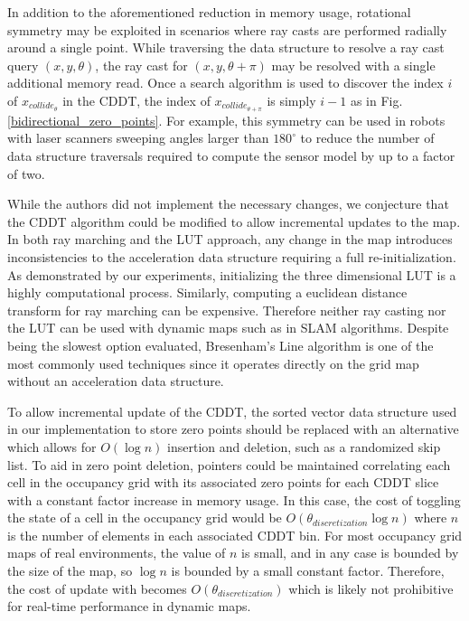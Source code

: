 \documentclass[letterpaper, 10 pt, conference]{ieeeconf}  %
\begin{document}
In addition to the aforementioned reduction in memory usage, rotational symmetry may be exploited in scenarios where ray casts are performed radially around a single point. While traversing the data structure to resolve a ray cast query $(x,y,\theta)$, the ray cast for $(x,y,\theta+\pi)$ may be resolved with a single additional memory read. Once a search algorithm is used to discover the index $i$ of $x_{collide_{\theta}}$ in the CDDT, the index of $x_{collide_{\theta+\pi}}$ is simply $i-1$ as in Fig. \ref{bidirectional_zero_points}. For example, this symmetry can be used in robots with laser scanners sweeping angles larger than $180^{\circ}$ to reduce the number of data structure traversals required to compute the sensor model by up to a factor of two.


While the authors did not implement the necessary changes, we conjecture that the CDDT algorithm could be modified to allow incremental updates to the map. In both ray marching and the LUT approach, any change in the map introduces inconsistencies to the acceleration data structure requiring a full re-initialization. As demonstrated by our experiments, initializing the three dimensional LUT is a highly computational process. Similarly, computing a euclidean distance transform for ray marching can be expensive. Therefore neither ray casting nor the LUT can be used with dynamic maps such as in SLAM algorithms. Despite being the slowest option evaluated, Bresenham's Line algorithm is one of the most commonly used techniques since it operates directly on the grid map without an acceleration data structure.

To allow incremental update of the CDDT, the sorted vector data structure used in our implementation to store zero points should be replaced with an alternative which allows for $O(\log{n})$ insertion and deletion, such as a randomized skip list. To aid in zero point deletion, pointers could be maintained correlating each cell in the occupancy grid with its associated zero points for each CDDT slice with a constant factor increase in memory usage. In this case, the cost of toggling the state of a cell in the occupancy grid would be $O(\theta_{discretization}\log{n})$ where $n$ is the number of elements in each associated CDDT bin. For most occupancy grid maps of real environments, the value of $n$ is small, and in any case is bounded by the size of the map, so $\log{n}$ is bounded by a small constant factor. Therefore, the cost of update with becomes $O(\theta_{discretization})$ which is likely not prohibitive for real-time performance in dynamic maps.
\end{document}
